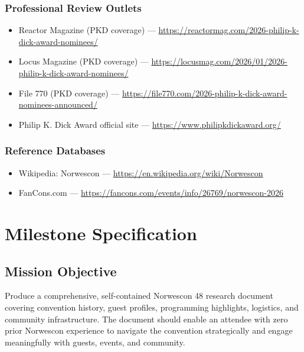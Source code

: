 \documentclass[11pt,letterpaper]{article}
\newcommand{\stageheader}[2]{%
  \noindent\colorbox{#2}{\makebox[\textwidth][l]{%
    \textcolor{white}{\bfseries\sffamily\hspace{6pt}#1\hspace{6pt}}}}%
  \vspace{0.5em}\par%
}
\begin{document}
\subsubsection{Professional Review Outlets}
\begin{itemize}[leftmargin=2em]
\item Reactor Magazine (PKD coverage) --- \url{https://reactormag.com/2026-philip-k-dick-award-nominees/}
\item Locus Magazine (PKD coverage) --- \url{https://locusmag.com/2026/01/2026-philip-k-dick-award-nominees/}
\item File 770 (PKD coverage) --- \url{https://file770.com/2026-philip-k-dick-award-nominees-announced/}
\item Philip K. Dick Award official site --- \url{https://www.philipkdickaward.org/}
\end{itemize}

\subsubsection{Reference Databases}
\begin{itemize}[leftmargin=2em]
\item Wikipedia: Norwescon --- \url{https://en.wikipedia.org/wiki/Norwescon}
\item FanCons.com --- \url{https://fancons.com/events/info/26769/norwescon-2026}
\end{itemize}

\newpage
\stageheader{STAGE 3 --- MISSION PACKAGE}{tertiary}

\section{Milestone Specification}

\subsection{Mission Objective}

Produce a comprehensive, self-contained Norwescon 48 research document covering convention history, guest profiles, programming highlights, logistics, and community infrastructure. The document should enable an attendee with zero prior Norwescon experience to navigate the convention strategically and engage meaningfully with guests, events, and community.
\end{document}
